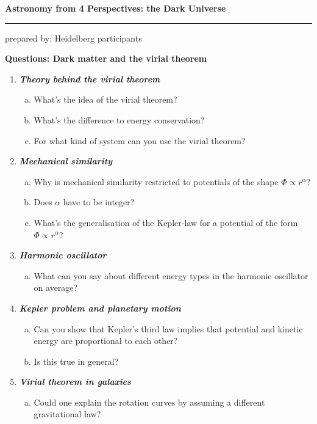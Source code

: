 \documentclass[a4paper,12pt]{article}
\newcommand{\question}[1]{\textbf{\textit{#1}}}
\newcommand{\HRule}{\rule{\linewidth}{0.3mm}}
\begin{document}
\pagestyle{empty}

\begin{center}
\LARGE \textbf{Astronomy from 4 Perspectives: the Dark Universe}
\HRule
\end{center}
\begin{flushright}
prepared by: Heidelberg participants
\end{flushright}
\begin{center}
{\Large \textbf{Questions: Dark matter and the virial theorem}}
\end{center}
\vspace{5mm}

\begin{enumerate}

\item \question{Theory behind the virial theorem}
\begin{enumerate}[(a)]
\item{What's the idea of the virial theorem?}
\item{What's the difference to energy conservation?}
\item{For what kind of system can you use the virial theorem?}
\end{enumerate}

\item \question{Mechanical similarity}
\begin{enumerate}[(a)]
\item{Why is mechanical similarity restricted to potentials of the shape $\Phi\propto r^\alpha$?}
\item{Does $\alpha$ have to be integer?}
\item{What's the generalisation of the Kepler-law for a potential of the form $\Phi\propto r^\alpha$?}
\end{enumerate}

\item \question{Harmonic oscillator}
\begin{enumerate}[(a)]
\item{What can you say about different energy types in the harmonic oscillator on average?}
\end{enumerate}

\item \question{Kepler problem and planetary motion}
\begin{enumerate}[(a)]
\item{Can you show that Kepler's third law implies that potential and kinetic energy are proportional to each other?}
\item{Is this true in general?}
\end{enumerate}

\item \question{Virial theorem in galaxies}\\
\begin{enumerate}[(a)]
\item{Could one explain the rotation curves by assuming a different gravitational law?}
\end{enumerate}

\end{enumerate}
\end{document}
